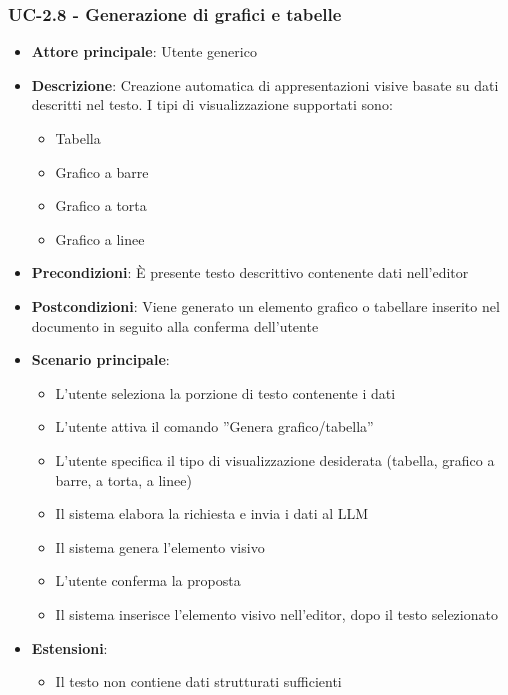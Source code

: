 \documentclass[11pt,a4paper]{article}
\begin{document}
\subsubsection{UC-2.8 - Generazione di grafici e tabelle}
\begin{itemize}
    \item \textbf{Attore principale}: Utente generico
    \item \textbf{Descrizione}: Creazione automatica di appresentazioni visive basate su dati descritti nel testo. I tipi di visualizzazione supportati sono:
        \begin{itemize}
            \item Tabella
            \item Grafico a barre
            \item Grafico a torta
            \item Grafico a linee
        \end{itemize}
    \item \textbf{Precondizioni}: È presente testo descrittivo contenente dati nell’editor
    \item \textbf{Postcondizioni}: Viene generato un elemento grafico o tabellare inserito nel documento in seguito alla conferma dell'utente
    \item \textbf{Scenario principale}:
    \begin{itemize}
    \item L’utente seleziona la porzione di testo contenente i dati
    \item L’utente attiva il comando ”Genera grafico/tabella”
    \item L’utente specifica il tipo di visualizzazione desiderata (tabella, grafico a barre, a torta, a linee)
    \item Il sistema elabora la richiesta e invia i dati al LLM
    \item Il sistema genera l'elemento visivo 
    \item L'utente conferma la proposta 
    \item Il sistema inserisce l'elemento visivo nell'editor, dopo il testo selezionato
    \end{itemize}
    \item \textbf{Estensioni}:
    \begin{itemize}
        \item Il testo non contiene dati strutturati sufficienti
    \end{itemize}
\end{itemize}
\end{document}
